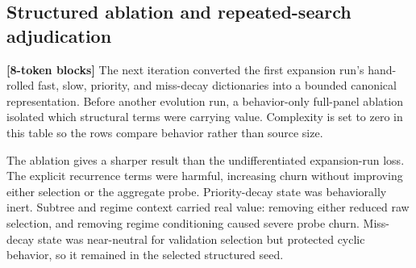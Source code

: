 \documentclass[11pt]{article}
\newcommand{\code}[1]{\texttt{\detokenize{#1}}}
\newcommand{\blocktag}[1]{\textbf{\color{navy}[#1-token blocks]}}
\begin{document}
\subsection{Structured ablation and repeated-search adjudication}
\label{sec:structured-search}

\blocktag{8} The next iteration converted the first expansion run's hand-rolled fast,
slow, priority, and miss-decay dictionaries into a bounded canonical
\code{MultiTimescaleDecay.observe_vector} representation.  Before another evolution
run, a behavior-only full-panel ablation isolated which structural terms were carrying
value.  Complexity is set to zero in this table so the rows compare behavior rather
than source size.

\begin{center}
\scriptsize
{}
\end{center}

The ablation gives a sharper result than the undifferentiated expansion-run loss.
The explicit recurrence terms were harmful, increasing churn without improving either
selection or the aggregate probe.  Priority-decay state was behaviorally inert.
Subtree and regime context carried real value: removing either reduced raw selection,
and removing regime conditioning caused severe probe churn.  Miss-decay state was
near-neutral for validation selection but protected cyclic behavior, so it remained
in the selected structured seed.
\end{document}
